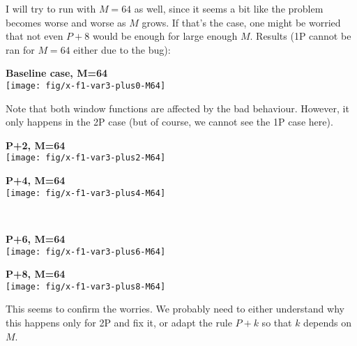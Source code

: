\documentclass[a4paper,10pt]{article}
\begin{document}
I will try to run with $M=64$ as well, since it seems a bit like
the problem becomes worse and worse as $M$ grows. If that's the
case, one might be worried that not even $P+8$ would be enough
for large enough $M$. Results (1P cannot be ran for $M=64$
either due to the bug):
\begin{center}
  \textbf{Baseline case, M=64}\\
  \texttt{[image: fig/x-f1-var3-plus0-M64]}
\end{center}
Note that both window functions are affected by the bad
behaviour. However, it only happens in the 2P case (but of
course, we cannot see the 1P case here).\\[\baselineskip]
\begin{minipage}{0.5\textwidth}\centering
  \textbf{P+2, M=64}\\
  \texttt{[image: fig/x-f1-var3-plus2-M64]}
\end{minipage}%
\begin{minipage}{0.5\textwidth}\centering
  \textbf{P+4, M=64}\\
  \texttt{[image: fig/x-f1-var3-plus4-M64]}
\end{minipage}\\
\begin{minipage}{0.5\textwidth}\centering
  \textbf{P+6, M=64}\\
  \texttt{[image: fig/x-f1-var3-plus6-M64]}
\end{minipage}%
\begin{minipage}{0.5\textwidth}\centering
  \textbf{P+8, M=64}\\
  \texttt{[image: fig/x-f1-var3-plus8-M64]}
\end{minipage}
This seems to confirm the worries. We probably need to either
understand why this happens only for 2P and fix it, or adapt the
rule $P+k$ so that $k$ depends on $M$.
\end{document}

